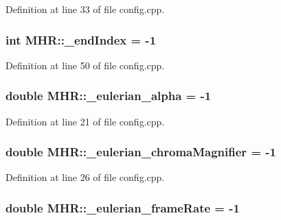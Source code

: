 Definition at line 33 of file config.\+cpp.

\hypertarget{namespace_m_h_r_a43ac6cb857f86cd5a9bc16e968faa1af}{
\subsubsection[{\+\_\+end\+Index}]{\setlength{\rightskip}{0pt plus 5cm}int M\+H\+R\+::\+\_\+end\+Index = -\/1}}\label{namespace_m_h_r_a43ac6cb857f86cd5a9bc16e968faa1af}


Definition at line 50 of file config.\+cpp.

\hypertarget{namespace_m_h_r_abbf22419d2dbaf1d661d5b73fc9af29b}{
\subsubsection[{\+\_\+eulerian\+\_\+alpha}]{\setlength{\rightskip}{0pt plus 5cm}double M\+H\+R\+::\+\_\+eulerian\+\_\+alpha = -\/1}}\label{namespace_m_h_r_abbf22419d2dbaf1d661d5b73fc9af29b}


Definition at line 21 of file config.\+cpp.

\hypertarget{namespace_m_h_r_ad69f0161c9597e078014c52955264fd2}{
\subsubsection[{\+\_\+eulerian\+\_\+chroma\+Magnifier}]{\setlength{\rightskip}{0pt plus 5cm}double M\+H\+R\+::\+\_\+eulerian\+\_\+chroma\+Magnifier = -\/1}}\label{namespace_m_h_r_ad69f0161c9597e078014c52955264fd2}


Definition at line 26 of file config.\+cpp.

\hypertarget{namespace_m_h_r_ab6b7928e4485f421869d4fbac9a5c1cd}{
\subsubsection[{\+\_\+eulerian\+\_\+frame\+Rate}]{\setlength{\rightskip}{0pt plus 5cm}double M\+H\+R\+::\+\_\+eulerian\+\_\+frame\+Rate = -\/1}}\label{namespace_m_h_r_ab6b7928e4485f421869d4fbac9a5c1cd}


